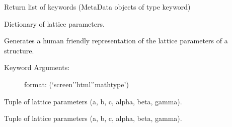 \documentclass[letterpaper,10pt,english]{sphinxmanual}
\begin{document}
\begin{fulllineitems}
\begin{fulllineitems}
\end{fulllineitems}


\begin{fulllineitems}
\label{models:qmpy.Structure.keyword_objects}
Return list of keywords (MetaData objects of type keyword)

\end{fulllineitems}


\begin{fulllineitems}
\label{models:qmpy.Structure.lat_param_dict}
Dictionary of lattice parameters.

\end{fulllineitems}


\begin{fulllineitems}
\label{models:qmpy.Structure.lat_param_string}
Generates a human friendly representation of the lattice parameters of
a structure.
\begin{description}
\item[{Keyword Arguments:}] \leavevmode
format: (`screen'\textbar{}'html'\textbar{}'mathtype')

\end{description}

\end{fulllineitems}


\begin{fulllineitems}
\label{models:qmpy.Structure.lat_params}
Tuple of lattice parameters (a, b, c, alpha, beta, gamma).

\end{fulllineitems}


\begin{fulllineitems}
\label{models:qmpy.Structure.lp}
Tuple of lattice parameters (a, b, c, alpha, beta, gamma).

\end{fulllineitems}


\end{fulllineitems}
\end{document}
